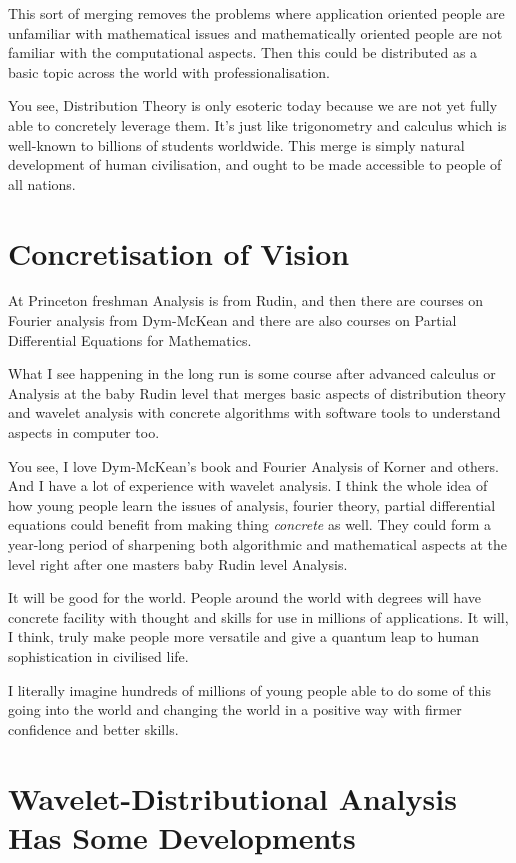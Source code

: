 \documentclass{amsart}
\begin{document}
This sort of merging removes the problems where application oriented people are unfamiliar with mathematical issues and mathematically oriented people are not familiar with the computational aspects.  Then this could be distributed as a basic topic across the world with professionalisation.  

You see, Distribution Theory is only esoteric today because we are not yet fully able to concretely leverage them. It's just like trigonometry and calculus which is well-known to billions of students worldwide. This merge is simply natural development of human civilisation, and ought to be made accessible to people of all nations.

\section{Concretisation of Vision}

At Princeton freshman Analysis is from Rudin, and then there are courses on Fourier analysis from Dym-McKean and there are also courses on Partial Differential Equations for Mathematics.

What I see happening in the long run is some course after advanced calculus or Analysis at the baby Rudin level that merges basic aspects of distribution theory and wavelet analysis with concrete algorithms with software tools to understand aspects in computer too.  

You see, I love Dym-McKean's book and Fourier Analysis of Korner and others.  And I have a lot of experience with wavelet analysis.  I think the whole idea of how young people learn the issues of analysis, fourier theory, partial differential equations could benefit from making thing {\em concrete} as well.  They could form a year-long period of sharpening both algorithmic and mathematical aspects at the level right after one masters baby Rudin level Analysis. 

It will be good for the world.  People around the world with degrees will have concrete facility with thought and skills for use in millions of applications.  It will, I think, truly make people more versatile and give a quantum leap to human sophistication in civilised life.

I literally imagine hundreds of millions of young people able to do some of this going into the world and changing the world in a positive way with firmer confidence and better skills.

\section{Wavelet-Distributional Analysis Has Some Developments}
\end{document}
